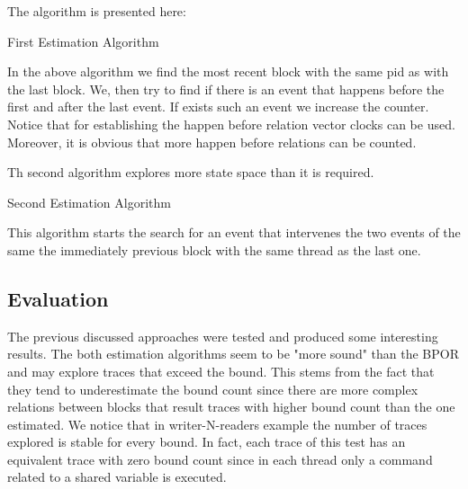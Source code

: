 The algorithm is presented here:\\

\begin{algorithm}[H]
    \caption{First Estimation Algorithm}
\end{algorithm}

In the above algorithm we find the most recent block with the same pid as with the last block. We, then try to find if there is an event that happens before the first
and after the last event. If exists such an event we increase the counter.
Notice that for establishing the happen before relation vector clocks can be used.
Moreover, it is obvious that more happen before relations can be counted.


Th second algorithm explores more state space than it is required.\\

\begin{algorithm}[H]
    \caption{Second Estimation Algorithm}
\end{algorithm}

This algorithm starts the search for an event that intervenes the two events of the same the immediately previous block with the same thread as the last one.

\subsection{Evaluation}
The previous discussed approaches were tested and produced some interesting results. The both estimation algorithms seem to be "more sound" than the BPOR and
may explore traces that exceed the bound. This stems from the fact that they tend to underestimate the bound count since there are more complex relations 
between blocks that result traces with higher bound count than the one estimated. We notice that in writer-N-readers example the number of traces explored
is stable for every bound. In fact, each trace of this test has an equivalent trace with zero bound count since in each thread only a command related to
a shared variable is executed.

